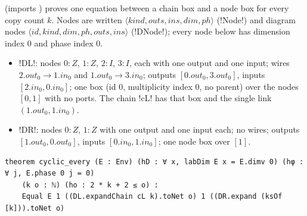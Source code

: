{ (imports ) proves one equation between a chain box and a node box for every copy count $k$. Nodes are written $\langle\mathit{kind},\mathit{outs},\mathit{ins},\mathit{dim},\mathit{ph}\rangle$ (\lbx!Node!) and diagram nodes $\langle\mathit{id},\mathit{kind},\mathit{dim},\mathit{ph},\mathit{outs},\mathit{ins}\rangle$ (\lbx!DNode!); every node below has dimension index $0$ and phase index $0$.

\begin{definition}\label{def:boxes-DL-DR}
\begin{itemize}
\item \lbx!DL!: nodes $0{:}Z$, $1{:}Z$, $2{:}I$, $3{:}I$, each with one output and one input; wires $2.\mathit{out}_0\to 1.\mathit{in}_0$ and $1.\mathit{out}_0\to 3.\mathit{in}_0$; outputs $[0.\mathit{out}_0,3.\mathit{out}_0]$, inputs $[2.\mathit{in}_0,0.\mathit{in}_0]$; one box (id $0$, multiplicity index $0$, no parent) over the nodes $[0,1]$ with no ports. The chain \lbx!cL! has that box and the single link $(1.\mathit{out}_0,1.\mathit{in}_0)$.
\item \lbx!DR!: nodes $0{:}Z$, $1{:}Z$ with one output and one input each; no wires; outputs $[1.\mathit{out}_0,0.\mathit{out}_0]$, inputs $[0.\mathit{in}_0,1.\mathit{in}_0]$; one node box over $[1]$.
\end{itemize}
\end{definition}

\begin{theorem}\label{thm:boxes-cyclic-every}
\begin{lstlisting}[style=leanbox]
theorem cyclic_every (E : Env) (hD : ∀ x, labDim E x = E.dimv 0) (hφ : ∀ j, E.phase 0 j = 0)
    (k o : ℕ) (ho : 2 * k + 2 ≤ o) :
    Equal E 1 ((DL.expandChain cL k).toNet o) 1 ((DR.expand (ksOf [k])).toNet o)
\end{lstlisting}
\end{theorem}

}
